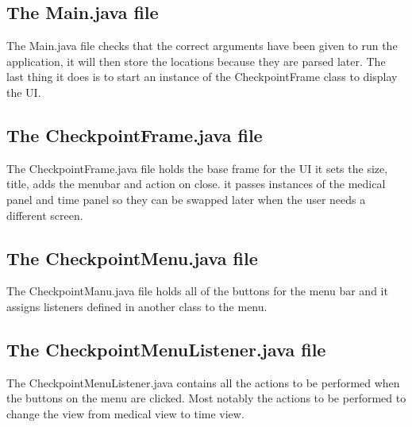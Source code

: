 \documentclass{article}
\begin{document}
\subsection{The Main.java file}
The Main.java file checks that the correct arguments have been
given to run the application, it will then store the locations
because they are parsed later. The last thing it does is to 
start an instance of the CheckpointFrame class to display the UI.


\subsection{The CheckpointFrame.java file}
The CheckpointFrame.java file holds the base frame for the UI
it sets the size, title, adds the menubar and action on close.
it passes instances of the medical panel and time panel so they
can be swapped later when the user needs a different screen.


\subsection{The CheckpointMenu.java file}
The CheckpointManu.java file holds all of the buttons for the menu
bar and it assigns listeners defined in another class to the menu.


\subsection{The CheckpointMenuListener.java file}
The CheckpointMenuListener.java contains all the actions to be 
performed when the buttons on the menu are clicked. Most notably
the actions to be performed to change the view from medical view to
time view.

\end{document}
